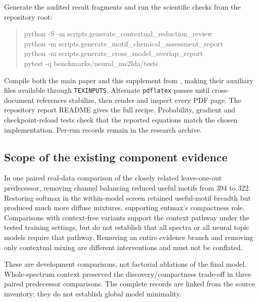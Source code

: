 \documentclass[10pt,a4paper]{article}
\begin{document}
Generate the audited result fragments and run the scientific checks from
the repository root:
\begin{quote}\small\ttfamily
python -S -m scripts.generate\_contextual\_reduction\_review\\
python -m scripts.generate\_motif\_chemical\_assessment\_report\\
python -m scripts.generate\_cross\_model\_overlap\_report\\
pytest -q benchmarks/neural\_ms2lda/tests
\end{quote}
Compile both the main paper and this supplement from ,
making their auxiliary files available through \texttt{TEXINPUTS}. Alternate
\texttt{pdflatex} passes until cross-document references stabilize, then render
and inspect every PDF page. The repository report README gives the full recipe. Probability,
gradient and checkpoint-reload tests check that the reported equations match
the chosen implementation. Per-run records remain in the research archive.

\subsection{Scope of the existing component evidence}
\label{app:ablations}
In one paired real-data comparison of the closely related leave-one-out
predecessor, removing channel balancing reduced useful motifs from 394 to 322.
Restoring softmax
in the within-model screen retained useful-motif breadth but produced much
more diffuse mixtures, supporting entmax's compactness role. Comparisons with
context-free variants support the context pathway under the tested training
settings, but do not establish that
all spectra or all neural topic models require that pathway. Removing an
entire evidence branch and removing only contextual mixing are different
interventions and must not be conflated.

These are development comparisons, not factorial ablations of the final model.
Whole-spectrum context preserved the discovery/compactness trade-off in three
paired predecessor comparisons. The complete records are linked from the
source inventory; they do not establish global model minimality.
\clearpage

\end{document}
